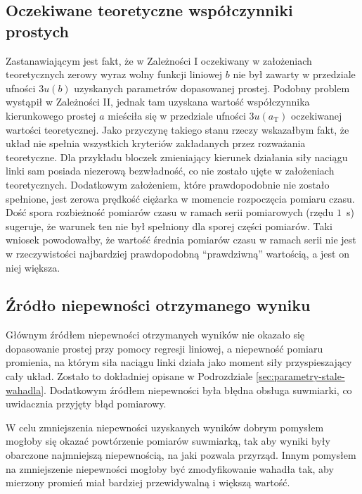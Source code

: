 \documentclass[twocolumn, a4paper, polish, 10pt]{article}
\begin{document}
\subsection{Oczekiwane teoretyczne współczynniki prostych}
Zastanawiającym jest fakt, że w Zależności I oczekiwany w założeniach teoretycznych zerowy wyraz wolny funkcji liniowej $b$ nie był zawarty w przedziale ufności $3u(b)$ uzyskanych parametrów dopasowanej prostej.
Podobny problem wystąpił w Zależności II, jednak tam uzyskana wartość współczynnika kierunkowego prostej $a$ mieściła się w przedziale ufności $3u(a_{\mathrm{T}})$ oczekiwanej wartości teoretycznej.
Jako przyczynę takiego stanu rzeczy wskazałbym fakt, że układ nie spełnia wszystkich kryteriów zakładanych przez rozważania teoretyczne.
Dla przykładu bloczek zmieniający kierunek działania siły naciągu linki sam posiada niezerową bezwładność, co nie zostało ujęte w założeniach teoretycznych.
Dodatkowym założeniem, które prawdopodobnie nie zostało spełnione, jest zerowa prędkość ciężarka w momencie rozpoczęcia pomiaru czasu.
Dość spora rozbieżność pomiarów czasu w ramach serii pomiarowych (rzędu $1$~s) sugeruje, że warunek ten nie był spełniony dla sporej części pomiarów.
Taki wniosek powodowałby, że wartość średnia pomiarów czasu w ramach serii nie jest w rzeczywistości najbardziej prawdopodobną \enquote{prawdziwną} wartością, a jest on niej większa.

\subsection{Źródło niepewności otrzymanego wyniku}
Głównym źródłem niepewności otrzymanych wyników nie okazało się dopasowanie prostej przy pomocy regresji liniowej, a niepewność pomiaru promienia, na którym siła naciągu linki działa jako moment siły przyspieszający cały układ.
Zostało to dokładniej opisane w Podrozdziale \ref{sec:parametry-stale-wahadla}.
Dodatkowym źródłem niepewności była błędna obsługa suwmiarki, co uwidacznia przyjęty błąd pomiarowy.

W celu zmniejszenia niepewności uzyskanych wyników dobrym pomysłem mogłoby się okazać powtórzenie pomiarów suwmiarką, tak aby wyniki były obarczone najmniejszą niepewnością, na jaki pozwala przyrząd.
Innym pomysłem na zmniejszenie niepewności mogłoby być zmodyfikowanie wahadła tak, aby mierzony promień miał bardziej przewidywalną i większą wartość.
\end{document}

